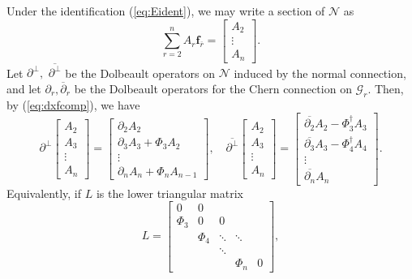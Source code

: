 \documentclass[11pt]{article}
\theoremstyle{definition}
\newcommand{\del}{\partial}
\newcommand{\delbar}{\overline{\partial}}
\numberwithin{equation}{section}
\begin{document}
Under the identification (\ref{eq:Eident}), we may write a section of $\mathcal{N}$ as
\begin{equation*}
	\sum_{r=2}^{n} A_r \mathbf{f}_{\overline r} = \begin{bmatrix}
	A_2 \\
	\vdots \\
	A_n
	\end{bmatrix}.
\end{equation*}
Let $\partial^{\perp},$ $\overline {\partial^{\perp}}$ be the Dolbeault operators on $\mathcal{N}$ induced by the normal connection, and let $\del_r, \delbar_r$ be the Dolbeault operators for the Chern connection on $\mathcal{G}_r.$  Then, by (\ref{eq:dxfcomp}), we have
\begin{equation}\label{eq:normconnsplit}
	\partial^{\perp} \begin{bmatrix}
	A_2 \\
	A_3 \\
	\vdots \\
	A_n
	\end{bmatrix} = \begin{bmatrix}
	\partial_2 A_2 \\
	\partial_3 A_3 + \Phi_3 A_2 \\
	\vdots \\
	\partial_n A_n + \Phi_n A_{n-1}
	\end{bmatrix}, \quad \overline{\partial^{\perp}} \begin{bmatrix}
	A_2 \\
	A_3 \\
	\vdots \\
	A_n
	\end{bmatrix} = \begin{bmatrix}
	\overline{\partial_2} A_2 - \Phi_3^\dagger A_3 \\
	\overline{\partial_3} A_3 - \Phi_4^\dagger A_4 \\
	\vdots \\
	\overline{\partial_n} A_n
	\end{bmatrix}.
\end{equation}
Equivalently, if $L$ is the lower triangular matrix
\begin{equation}
	L = \begin{bmatrix}
	0 & 0 &  & & \\
	{\Phi_3} & 0 & 0 &  & \\
	& {\Phi_4} & \ddots & \ddots & \\
	& & \ddots & & \\
	& & & {\Phi_n} & 0
	\end{bmatrix},
\end{equation}
\end{document}
